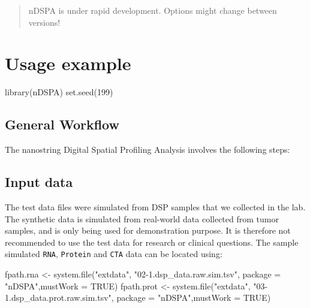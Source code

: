 \documentclass[]{article}
\newcommand{\hlnum}[1]{\textcolor[rgb]{0.816,0.125,0.439}{#1}}%
\newcommand{\hlstr}[1]{\textcolor[rgb]{0.251,0.627,0.251}{#1}}%
\newcommand{\hlstd}[1]{\textcolor[rgb]{0.251,0.251,0.251}{#1}}%
\newenvironment{Shaded}{\begin{myshaded}}{\end{myshaded}}
\newcommand{\DecValTok}[1]{\hlnum{#1}}
\newcommand{\ConstantTok}[1]{\hlnum{#1}}
\newcommand{\StringTok}[1]{\hlstr{#1}}
\newcommand{\OtherTok}[1]{{#1}}
\newcommand{\FunctionTok}[1]{\hlstd{#1}}
\newcommand{\AttributeTok}[1]{{#1}}
\newcommand{\NormalTok}[1]{\hlstd{#1}}
\begin{document}
\begin{quote}
nDSPA is under rapid development. Options might change between versions!
\end{quote}

\hypertarget{usage-example}{%
\section{Usage example}\label{usage-example}}

\begin{Shaded}
\begin{Highlighting}[]
\FunctionTok{library}\NormalTok{(nDSPA)}
\FunctionTok{set.seed}\NormalTok{(}\DecValTok{199}\NormalTok{)}
\end{Highlighting}
\end{Shaded}

\hypertarget{general-workflow}{%
\subsection{General Workflow}\label{general-workflow}}

The nanostring Digital Spatial Profiling Analysis involves the following steps:

\hypertarget{input-data}{%
\subsection{Input data}\label{input-data}}

The test data files were simulated from DSP samples that we collected in the
lab. The synthetic data is simulated from real-world data collected from tumor
samples, and is only being used for demonstration purpose. It is therefore not
recommended to use the test data for research or clinical questions.
The sample simulated \texttt{RNA}, \texttt{Protein} and \texttt{CTA} data can be located using:

\begin{Shaded}
\begin{Highlighting}[]

\NormalTok{fpath.rna }\OtherTok{\textless{}{-}} \FunctionTok{system.file}\NormalTok{(}\StringTok{"extdata"}\NormalTok{, }\StringTok{"02{-}1.dsp\_data.raw.sim.tsv"}\NormalTok{, }\AttributeTok{package =} 
                           \StringTok{"nDSPA"}\NormalTok{,}\AttributeTok{mustWork =} \ConstantTok{TRUE}\NormalTok{)}
\NormalTok{fpath.prot }\OtherTok{\textless{}{-}} \FunctionTok{system.file}\NormalTok{(}\StringTok{"extdata"}\NormalTok{, }\StringTok{"03{-}1.dsp\_data.prot.raw.sim.tsv"}\NormalTok{, }
                          \AttributeTok{package =} \StringTok{"nDSPA"}\NormalTok{,}\AttributeTok{mustWork =} \ConstantTok{TRUE}\NormalTok{)}
\end{Highlighting}
\end{Shaded}
\end{document}
